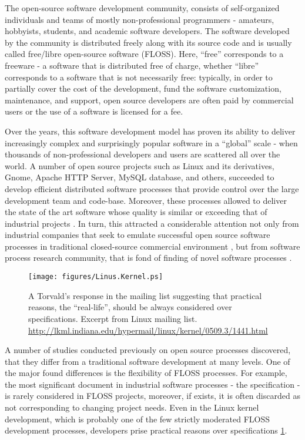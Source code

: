 The open-source software development community, consists of self-organized individuals and teams of 
mostly non-professional programmers - amateurs, hobbyists, students, and academic software developers. 
The software developed by the community is distributed freely along with its source code and is 
usually called free/libre open-source software (FLOSS). Here, ``free'' corresponds to a freeware - 
a software that is distributed free of charge, whether ``libre'' corresponds to a software that is 
not necessarily free: typically, in order to partially cover the cost of the development, 
fund the software customization, maintenance, and support, open source developers are often paid 
by commercial users or the use of a software is licensed for a fee.

Over the years, this software development model has proven its ability to deliver increasingly complex 
and surprisingly popular software in a ``global'' scale - when thousands of non-professional developers 
and users are scattered all over the world. A number of open source projects such as Linux and its 
derivatives, Gnome, Apache HTTP Server, MySQL database, and others, succeeded to develop efficient 
distributed software processes that provide control over the large development team and code-base.
Moreover, these processes allowed to deliver the state of the art software whose quality is similar 
or exceeding that of industrial projects \cite{coverity2012}. 
In turn, this attracted a considerable attention not only from industrial companies that seek to emulate 
successful open source software processes in traditional closed-source commercial environment 
\cite{oss_virtual_organizations} \cite{oss_balance} \cite{oss_hp} \cite{oss_4industry}, 
but from software process research community, that is fond of finding of novel software processes
\cite{citeulike:12550640} \cite{citeulike:5043664} \cite{citeulike:5128808} \cite{citeulike:10377366}.

\begin{figure}[ht!]
   \centering
   \texttt{[image: figures/Linus.Kernel.ps]}
   \caption{A Torvald's response in the mailing list suggesting that practical reasons, the ``real-life'', 
   should be always considered over specifications.
   Excerpt from Linux mailing list. \url{http://lkml.indiana.edu/hypermail/linux/kernel/0509.3/1441.html}}
   \label{fig:kernel}
\end{figure}

A number of studies conducted previously on open source processes discovered, that they differ from a 
traditional software development at many levels. 
One of the major found differences is the flexibility of FLOSS processes. 
For example, the most significant document in industrial software processes - the specification - is rarely 
considered in FLOSS projects, moreover, if exists, it is often discarded as not corresponding to changing 
project needs. 
Even in the Linux kernel development, which is probably one of the few strictly moderated FLOSS development 
processes, developers prise practical reasons over specifications \ref{fig:kernel}.

